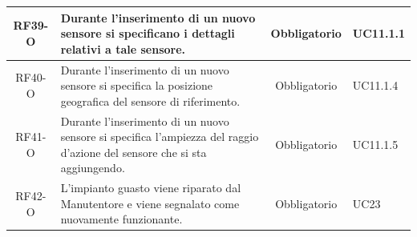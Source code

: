 \documentclass[a4paper, 12pt]{article}
\begin{document}
\begin{longtable}{|c|p{7cm}|c|p{4cm}|}
    \hline
    RF39-O & Durante l'inserimento di un nuovo sensore si specificano i dettagli relativi a tale sensore. & Obbligatorio & UC11.1.1\\
    \hline
    RF40-O & Durante l'inserimento di un nuovo sensore si specifica la posizione geografica del sensore di riferimento. & Obbligatorio & UC11.1.4\\
    \hline
    RF41-O & Durante l'inserimento di un nuovo sensore si specifica l'ampiezza del raggio d'azione del sensore che si sta aggiungendo. & Obbligatorio & UC11.1.5\\
    \hline
    RF42-O & L'impianto guasto viene riparato dal Manutentore e viene segnalato come nuovamente funzionante. & Obbligatorio & UC23\\

    
    
    
    
    \bottomrule
\end{longtable}
\end{document}
